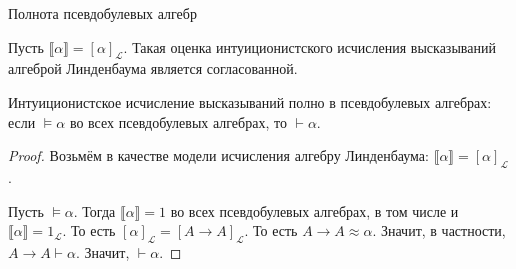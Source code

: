 \documentclass[aspectratio=169]{beamer}
\begin{document}
\begin{frame}{Полнота псевдобулевых алгебр}
\begin{thmrus}Пусть $\llbracket\alpha\rrbracket = [\alpha]_\mathcal{L}$.
Такая оценка интуиционистского исчисления высказываний алгеброй Линденбаума является согласованной.
\end{thmrus}

\begin{thmrus}Интуиционистское исчисление высказываний полно в псевдобулевых алгебрах:
если $\models\alpha$ во всех псевдобулевых алгебрах, то $\vdash\alpha$. \end{thmrus}
\begin{proof}Возьмём в качестве модели исчисления алгебру Линденбаума: 
$\llbracket \alpha \rrbracket = [\alpha]_\mathcal{L}$. 

Пусть $\models\alpha$. Тогда $\llbracket\alpha\rrbracket = 1$ во всех псевдобулевых алгебрах, в том числе
и $\llbracket\alpha\rrbracket = 1_\mathcal{L}$. То есть $[\alpha]_\mathcal{L} = [A\rightarrow A]_\mathcal{L}$.
То есть $A \rightarrow A \approx \alpha$. Значит, в частности, $A \rightarrow A \vdash \alpha$. 
Значит, $\vdash\alpha$.\end{proof}
\end{frame}
\end{document}
